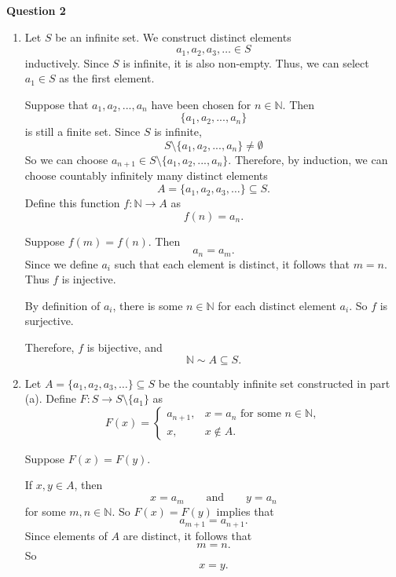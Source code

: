 \documentclass[12pt]{article}
\begin{document}
\noindent{} \textbf{Question 2}
\begin{enumerate}
    \item [(a)] Let $S$ be an infinite set.
          We construct distinct elements
          \[
              a_1,a_2,a_3,\ldots\in S
          \]
          inductively.
          Since $S$ is infinite, it is also non-empty.
          Thus, we can select $a_1 \in S$ as the first element.

          Suppose that $a_1, a_2, ... , a_n$ have been chosen for $n \in \mathbb{N}$.
          Then
          \[
              \{a_1, a_2, ... , a_n\}
          \]
          is still a finite set. Since $S$ is infinite,
          \[
              S \setminus \{a_1, a_2, ... , a_n\} \neq \emptyset
          \]
          So we can choose $a_{n+1} \in S \setminus \{a_1, a_2, ... , a_n\}$.
          Therefore, by induction, we can choose countably infinitely many distinct elements
          \[
              A = \{a_1,a_2,a_3,\ldots\} \subseteq S.
          \]
          Define this function $f: \mathbb{N} \to A$ as
          \[
              f(n) = a_n.
          \]

          Suppose $f(m) = f(n)$. Then
          \[
              a_n = a_m.
          \]
          Since we define $a_i$ such that each element is distinct,
          it follows that $m = n$. Thus $f$ is injective.

          By definition of $a_i$, there is some $n \in \mathbb{N}$
          for each distinct element $a_i$. So $f$ is surjective.

          Therefore, $f$ is bijective, and
          \[
              \mathbb{N} \sim A \subseteq S.
          \]
    \item [(b)]
          Let $A = \{a_1,a_2,a_3,\ldots\} \subseteq S$ be the countably
          infinite set constructed in part (a).
          Define $F: S \to S \setminus \{a_1\}$ as
          \[
              F(x)=
              \begin{cases}
                  a_{n+1}, & x=a_n\text{ for some }n\in\mathbb N, \\
                  x,       & x\notin A.
              \end{cases}
          \]

          Suppose $F(x) = F(y)$.

          If $x,y \in A$, then
          \[
              x = a_m \qquad \text{and} \qquad y = a_n
          \]
          for some $m,n \in \mathbb{N}$.
          So $F(x) = F(y)$ implies that
          \[
              a_{m+1} = a_{n+1}.
          \]
          Since elements of $A$ are distinct, it follows that
          \[
              m = n.
          \]
          So
          \[
              x=y.
          \]


\end{enumerate}
\end{document}

